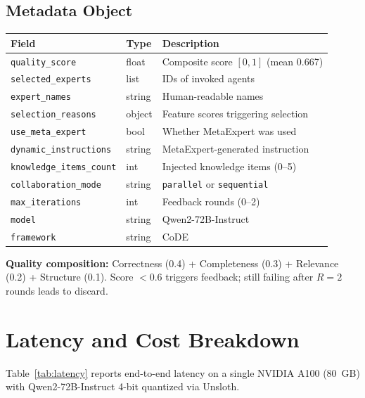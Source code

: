 \documentclass[sigconf,nonacm]{acmart}
\begin{document}
\subsection{Metadata Object}

\begin{table}[h]
\centering
\small
\begin{tabular}{@{}p{3.2cm}p{1.5cm}p{5.8cm}@{}}
\toprule
\textbf{Field} & \textbf{Type} & \textbf{Description} \\
\midrule
\texttt{quality\_score} & float & Composite score $[0,1]$ (mean 0.667) \\
\texttt{selected\_experts} & list & IDs of invoked agents \\
\texttt{expert\_names} & string & Human-readable names \\
\texttt{selection\_reasons} & object & Feature scores triggering selection \\
\texttt{use\_meta\_expert} & bool & Whether MetaExpert was used \\
\texttt{dynamic\_instructions} & string & MetaExpert-generated instruction \\
\texttt{knowledge\_items\_count} & int & Injected knowledge items (0--5) \\
\texttt{collaboration\_mode} & string & \texttt{parallel} or \texttt{sequential} \\
\texttt{max\_iterations} & int & Feedback rounds (0--2) \\
\texttt{model} & string & Qwen2-72B-Instruct \\
\texttt{framework} & string & CoDE \\
\bottomrule
\end{tabular}
\end{table}

\noindent\textbf{Quality composition:} Correctness (0.4) + Completeness (0.3) + Relevance (0.2) + Structure (0.1). Score $<0.6$ triggers feedback; still failing after $R=2$ rounds leads to discard.

\section{Latency and Cost Breakdown}

Table~\ref{tab:latency} reports end-to-end latency on a single NVIDIA A100 (80~GB) with Qwen2-72B-Instruct 4-bit quantized via Unsloth.
\end{document}
